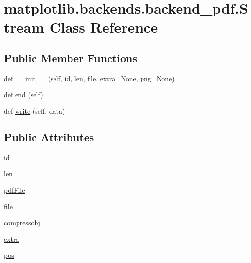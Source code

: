 \hypertarget{classmatplotlib_1_1backends_1_1backend__pdf_1_1Stream}{}\section{matplotlib.\+backends.\+backend\+\_\+pdf.\+Stream Class Reference}
\label{classmatplotlib_1_1backends_1_1backend__pdf_1_1Stream}
\subsection*{Public Member Functions}
\begin{DoxyCompactItemize}
\item 
def \hyperlink{classmatplotlib_1_1backends_1_1backend__pdf_1_1Stream_adda86c35662f554973c6ede5621614e0}{\+\_\+\+\_\+init\+\_\+\+\_\+} (self, \hyperlink{classmatplotlib_1_1backends_1_1backend__pdf_1_1Stream_aeda274c158466fe4aac1c8a7f8ed44cf}{id}, \hyperlink{classmatplotlib_1_1backends_1_1backend__pdf_1_1Stream_ad1c8337db314a00e1af7d944c34af21d}{len}, \hyperlink{classmatplotlib_1_1backends_1_1backend__pdf_1_1Stream_a9be461dcc33fd5c0ee5802149475f8e0}{file}, \hyperlink{classmatplotlib_1_1backends_1_1backend__pdf_1_1Stream_a75d9c477e09a34910561a308b12cad47}{extra}=None, png=None)
\item 
def \hyperlink{classmatplotlib_1_1backends_1_1backend__pdf_1_1Stream_a32be4cffbc4297b9137f57386213a32c}{end} (self)
\item 
def \hyperlink{classmatplotlib_1_1backends_1_1backend__pdf_1_1Stream_a5587b814638f28aaeed8ce109555e639}{write} (self, data)
\end{DoxyCompactItemize}
\subsection*{Public Attributes}
\begin{DoxyCompactItemize}
\item 
\hyperlink{classmatplotlib_1_1backends_1_1backend__pdf_1_1Stream_aeda274c158466fe4aac1c8a7f8ed44cf}{id}
\item 
\hyperlink{classmatplotlib_1_1backends_1_1backend__pdf_1_1Stream_ad1c8337db314a00e1af7d944c34af21d}{len}
\item 
\hyperlink{classmatplotlib_1_1backends_1_1backend__pdf_1_1Stream_aa65361205e5e013779fca88b2f4a5d4c}{pdf\+File}
\item 
\hyperlink{classmatplotlib_1_1backends_1_1backend__pdf_1_1Stream_a9be461dcc33fd5c0ee5802149475f8e0}{file}
\item 
\hyperlink{classmatplotlib_1_1backends_1_1backend__pdf_1_1Stream_a33ba58a69eb8b11bebbbdce4f4adac1c}{compressobj}
\item 
\hyperlink{classmatplotlib_1_1backends_1_1backend__pdf_1_1Stream_a75d9c477e09a34910561a308b12cad47}{extra}
\item 
\hyperlink{classmatplotlib_1_1backends_1_1backend__pdf_1_1Stream_a451ac5d7a96af9fbc8598cccb618a0d9}{pos}
\end{DoxyCompactItemize}


